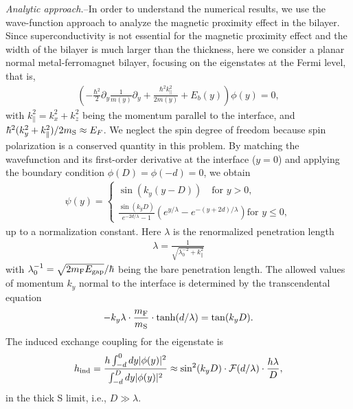 \documentclass[aps,prl,twocolumn,superscriptaddress,showpacs,longbibliography]{revtex4-1}
\begin{document}
\emph{Analytic approach.}--In order to understand the numerical results, we use the wave-function approach to analyze the magnetic proximity effect in the bilayer. Since superconductivity is not essential for the magnetic proximity effect and the width of the bilayer is much larger than the thickness, here we consider a planar normal metal-ferromagnet bilayer, focusing on the eigenstates at the Fermi level, that is,
\begin{align}
\left( -\frac{\hbar^2}{2} \partial_y \frac{1}{m(y)} \partial_y + \frac{\hbar^2k^2_{\parallel}}{2 m(y)} + E_b(y)   \right) \phi(y) = 0,
\end{align}
with $k^2_{\parallel} = k^2_x + k^2_z$ being the momentum parallel to the interface, and $\hbar^2(k^2_y + k^2_{\parallel})/2m_{\rm{S}} \approx E_F$. We neglect the spin degree of freedom because spin polarization is a conserved quantity in this problem. By matching the wavefunction and its first-order derivative at the interface ($y=0$) and applying the boundary condition $ \phi(D) = \phi(-d) =0$, we obtain
\begin{align}
\psi(y) = \left\{ 
\begin{array}{ll}   \sin (k_y(y-D))  \quad  \text{for }  y>0,\\
   \frac{ \sin (k_y D)}{ e^{-2d/\lambda} - 1} \left( e^{y/\lambda} -  e^{-(y+2d)/\lambda} \right)  \text{for }  y \leq 0,
\end{array}\right.
\end{align}
up to a normalization constant. Here $\lambda$ is the renormalized penetration length
\begin{align}
\lambda = \frac{1}{\sqrt{\lambda^{-2}_0 + k^2_{\parallel} }}
\label{eq:lambda}
\end{align}
with $\lambda^{-1}_0 =   \sqrt{2m_{\rm{F}}E_{\text{gap}}} / \hbar$ being the bare penetration length. The allowed values of momentum $k_y$ normal to the interface is determined by the transcendental equation
\begin{align}
-k_y \lambda \cdot \frac{m_{\rm{F}}}{m_{\rm{S}}} \cdot  \tanh (d/\lambda) = \tan (k_y D).
\label{eq:trans}
\end{align}
The induced exchange coupling for the eigenstate is
\begin{align}
h_{\rm{ind}} =  \frac{ h \int^0_{-d} dy |\phi(y)|^2}{ \int^D_{-d} dy |\phi(y)|^2 } \approx  \sin^2 (k_y D) \cdot \mathcal{F}(d/\lambda) \cdot \frac{h\lambda }{D},
\label{eq:analytic}
\end{align}
in the thick S limit, i.e., $D \gg \lambda$.
\end{document}
